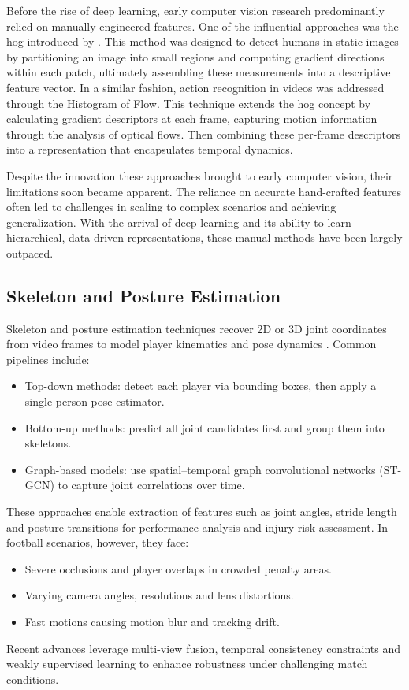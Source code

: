 Before the rise of deep learning, early computer vision research predominantly relied on manually engineered features. One of the influential approaches was the \acrfull{hog} introduced by \textcite{dalal_histogram_of_gradients}. This method was designed to detect humans in static images by partitioning an image into small regions and computing gradient directions within each patch, ultimately assembling these measurements into a descriptive feature vector. In a similar fashion, action recognition in videos was addressed through the Histogram of Flow\cite{dalal_histogram_of_flow}. This technique extends the \acrshort{hog} concept by calculating gradient descriptors at each frame, capturing motion information through the analysis of optical flows. Then combining these per-frame descriptors into a representation that encapsulates temporal dynamics.

Despite the innovation these approaches brought to early computer vision, their limitations soon became apparent. The reliance on accurate hand-crafted features often led to challenges in scaling to complex scenarios and achieving generalization. With the arrival of deep learning and its ability to learn hierarchical, data-driven representations, these manual methods have been largely outpaced. 

\subsection{Skeleton and Posture Estimation}
\label{ssec:skeleton_posture_estimation}

Skeleton and posture estimation techniques recover 2D or 3D joint coordinates from video frames to model player kinematics and pose dynamics \cite{elaoud_skeleton-based_2020, wang_skeleton_two-stream_2023, reilly__skeleton_just_pi_2023}. Common pipelines include:
\begin{itemize}
    \item Top-down methods: detect each player via bounding boxes, then apply a single-person pose estimator.
    \item Bottom-up methods: predict all joint candidates first and group them into skeletons.
    \item Graph-based models: use spatial–temporal graph convolutional networks (ST-GCN) to capture joint correlations over time.
\end{itemize}
These approaches enable extraction of features such as joint angles, stride length and posture transitions for performance analysis and injury risk assessment. In football scenarios, however, they face:
\begin{itemize}
    \item Severe occlusions and player overlaps in crowded penalty areas.
    \item Varying camera angles, resolutions and lens distortions.
    \item Fast motions causing motion blur and tracking drift.
\end{itemize}
Recent advances leverage multi-view fusion, temporal consistency constraints and weakly supervised learning to enhance robustness under challenging match conditions.



